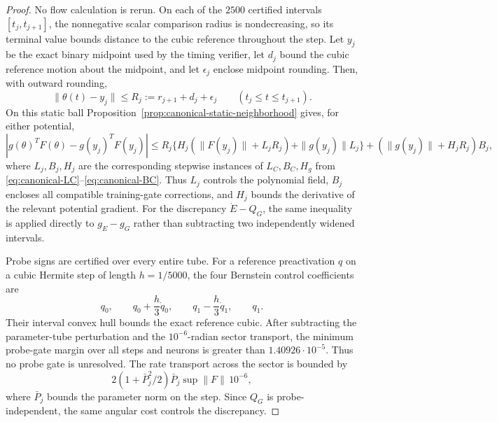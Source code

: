 \documentclass[10pt]{article}
\theoremstyle{remark}\newtheorem{remark}[theorem]{Remark}
\begin{document}
\begin{proof}
No flow calculation is rerun. On each of the $2500$ certified intervals
$[t_j,t_{j+1}]$, the nonnegative scalar comparison radius is nondecreasing,
so its terminal value bounds distance to the cubic reference throughout the
step. Let $y_j$ be the exact binary midpoint used by the timing verifier,
let $d_j$ bound the cubic reference motion about the midpoint, and let
$\epsilon_j$ enclose midpoint rounding. Then, with outward rounding,
\[
 \|\theta(t)-y_j\|\le R_j:=r_{j+1}+d_j+\epsilon_j
 \qquad(t_j\le t\le t_{j+1}).
\]
On this static ball Proposition~\ref{prop:canonical-static-neighborhood}
gives, for either potential,
\begin{equation}\label{eq:canonical-static-rate-bound}
 |g(\theta)^TF(\theta)-g(y_j)^TF(y_j)|
 \le R_j\{H_j(\|F(y_j)\|+L_jR_j)+\|g(y_j)\|L_j\}
       +(\|g(y_j)\|+H_jR_j)B_j,
\end{equation}
where $L_j,B_j,H_j$ are the corresponding stepwise instances of
$L_C,B_C,H_g$ from
\eqref{eq:canonical-LC}--\eqref{eq:canonical-BC}. Thus $L_j$ controls the
polynomial field, $B_j$ encloses all compatible training-gate corrections,
and $H_j$ bounds the derivative of the relevant potential gradient. For the discrepancy
$\dot E-Q_G$, the same inequality is applied directly to $g_E-g_G$ rather
than subtracting two independently widened intervals.

Probe signs are certified over every entire tube. For a reference
preactivation $q$ on a cubic Hermite step of length $h=1/5000$, the four
Bernstein control coefficients are
\[
 q_0,\qquad q_0+\frac h3\dot q_0,\qquad
 q_1-\frac h3\dot q_1,\qquad q_1.
\]
Their interval convex hull bounds the exact reference cubic. After subtracting
the parameter-tube perturbation and the $10^{-6}$-radian sector transport,
the minimum probe-gate margin over all steps and neurons is greater than
$1.40926\cdot10^{-5}$. Thus no probe gate is unresolved. The rate transport
across the sector is bounded by
\[
 2(1+\bar P_j^2/2)\bar P_j\sup\|F\|\,10^{-6},
\]
where $\bar P_j$ bounds the parameter norm on the step. Since $Q_G$ is
probe-independent, the same angular cost controls the discrepancy.


\end{proof}
\end{document}
